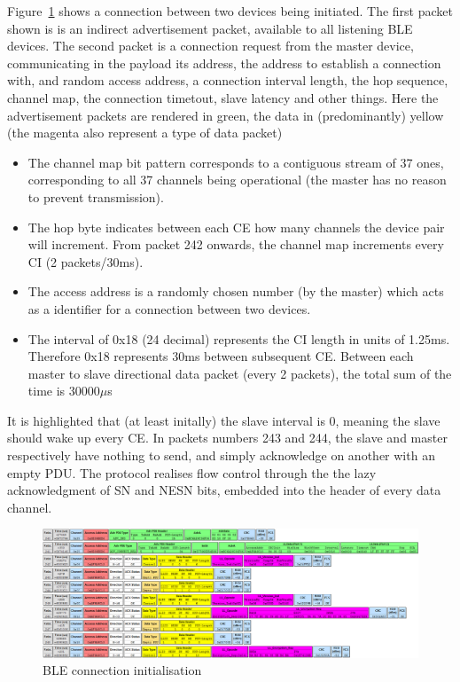 \documentclass[]{article}
\begin{document}
Figure~\ref{fig:connection} shows a connection between two devices being initiated. The first packet shown is is an indirect advertisement packet, available to all listening \ac{BLE} devices. The second packet is a connection request from the master device, communicating in the payload its address, the address to establish a connection with, and random access address, a connection interval length, the hop sequence, channel map, the connection timetout, slave latency and other things. Here the advertisement packets are rendered in green, the data in (predominantly) yellow (the magenta also represent a type of data packet)
\begin{itemize}

 \item The channel map bit pattern corresponds to a contiguous stream of 37 ones, corresponding to all 37 channels being operational (the master has no reason to prevent transmission). 
 \item The hop byte indicates between each \ac{CE} how many channels the device pair will increment. From packet 242 onwards, the channel map increments every \ac{CI} (2 packets/30ms).
 \item The access address is a randomly chosen number (by the master) which acts as a identifier for a connection between two devices. 
 \item The interval of 0x18 (24 decimal) represents the \ac{CI} length in units of 1.25ms. Therefore 0x18 represents 30ms between subsequent \ac{CE}. Between each master to slave directional data packet (every 2 packets), the total sum of the time is 30000$\mu$s

\end{itemize}

It is highlighted that (at least initally) the slave interval is 0, meaning the slave should wake up every \ac{CE}. In packets numbers 243 and 244, the slave and master respectively have nothing to send, and simply acknowledge on another with an empty \ac{PDU}. The protocol realises flow control through the the lazy acknowledgment of \ac{SN} and \ac{NESN} bits, embedded into the header of every data channel.

\begin{figure}[!h]
	\begin{center}
		\includegraphics[width = 1.4\textwidth, angle=90]{connection}
	\end{center}
	\caption{\ac{BLE} connection initialisation}
	\label{fig:connection}
\end{figure}
\end{document}
